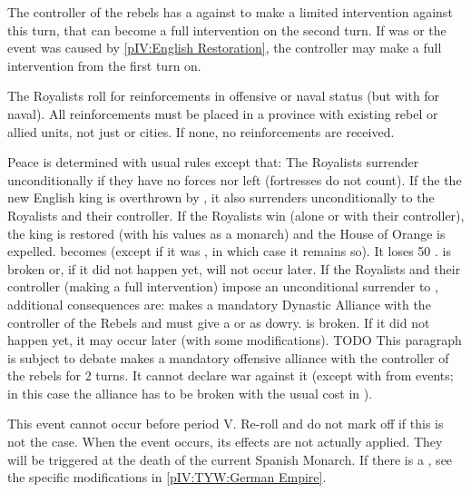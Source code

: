 \phdipl
\aparag The controller of the rebels has a \CB against \ENG to make a limited
intervention against \ENG this turn, that can become a full intervention on
the second turn. If \ENG was \CATHCR or the event was caused by
\ref{pIV:English Restoration}, the controller may make a full intervention
from the first turn on.

\phadm
\aparag The Royalists roll for reinforcements in offensive or naval status
(but with  for naval).
\aparag All reinforcements must be placed in a province with existing rebel or
allied units, not just \REVOLT or cities. If none, no reinforcements are
received.

\phpaix
\aparag Peace is determined with usual rules except that:
\bparag The Royalists surrender unconditionally if they have no forces nor
\REVOLT left (fortresses do not count).
\aparag If the the new English king is overthrown by \REVOLT , it also
surrenders unconditionally to the Royalists and their controller.
 If the Royalists win (alone or with their
controller), the king is restored (with his values as a monarch) and the House
of Orange is expelled.
\bparag \ENG becomes \CATHCR (except if it was \CATHCO, in which case it
remains so). It loses 50 \PV.
\bparag {} is broken or, if it did not happen yet, will
not occur later.
 If the Royalists and their controller
(making a full intervention) impose an unconditional surrender to \ENG,
additional consequences are:
\bparag \ENG makes a mandatory Dynastic Alliance with the controller of the
Rebels and must give a \COL or \TP as dowry.
\bparag {} is broken. If it did not happen yet, it may
occur later (with some modifications). TODO This paragraph is subject to
debate
\bparag \ENG makes a mandatory offensive alliance with the controller of the
rebels for 2 turns. It cannot declare war against it (except with \CB from
events; in this case the alliance has to be broken with the usual cost in
\STAB).





\activation{}
\aparag This event cannot occur before period V. Re-roll and do not mark off
if this is not the case.
\aparag When the event occurs, its effects are not actually applied. They will
be triggered at the death of the current Spanish Monarch.
\aparag If there is a \GE, see the specific modifications in
\ref{pIV:TYW:German Empire}.

